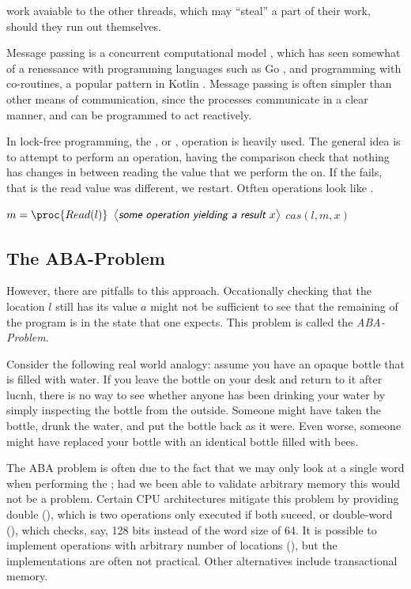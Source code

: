 work avaiable to the other threads, which may ``steal'' a part of their work, should they run out
themselves.

Message passing is a concurrent computational model , which has seen somewhat of a
renessance with programming languages such as Go , and programming with co-routines, a
popular pattern in Kotlin . Message passing is often simpler than other means of
communication, since the processes communicate in a clear manner, and can be programmed to act
reactively.

In lock-free programming, the , or , operation is heavily used.
The general idea is to attempt to perform an operation, having the comparison check that nothing
has changes in between reading the value that we perform the  on. If the 
fails, that is the read value was different, we restart. Otften operations look like
.

\begin{codebox}
\li \While \Then
\li $m = \proc{Read(l)}$
\li $\lit{some operation yielding a result $x$}$
\li \If $cas(l, m, x)$ \Then
\li \Return
\End \End
\end{codebox}

\subsection{The ABA-Problem\label{sec:aba-problem}}

However, there are pitfalls to this approach. Occationally checking that the location $l$ still has
its value $a$ might not be sufficient to see that the remaining of the program is in the state that
one expects. This problem is called the \emph{ABA-Problem}.

Consider the following real world analogy: assume you have an opaque bottle that is filled with
water. If you leave the bottle on your desk and return to it after lucnh, there is no way to see
whether anyone has been drinking your water by simply inspecting the bottle from the outside.
Someone might have taken the bottle, drunk the water, and put the bottle back as it were. Even
worse, someone might have replaced your bottle with an identical bottle filled with bees.

The ABA problem is often due to the fact that we may only look at a single word when
performing the ; had we been able to validate arbitrary memory this would not be a
problem. Certain CPU architectures mitigate this problem by providing double 
(), which is two  operations only executed if both suceed, or double-word
 (), which checks, say, 128 bits instead of the word size of 64.
It is possible to implement  operations with arbitrary number of locations
(), but the implementations are often not practical.  Other alternatives
include transactional memory.


